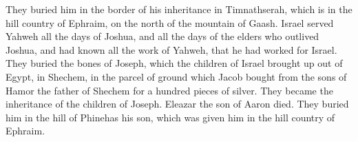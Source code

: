 {They buried him in the border of his inheritance in Timnathserah, which is in the hill country of Ephraim, on the north of the mountain of Gaash.
Israel served Yahweh all the days of Joshua, and all the days of the elders who outlived Joshua, and had known all the work of Yahweh, that he had worked for Israel.
They buried the bones of Joseph, which the children of Israel brought up out of Egypt, in Shechem, in the parcel of ground which Jacob bought from the sons of Hamor the father of Shechem for a hundred pieces of silver. They became the inheritance of the children of Joseph.
Eleazar the son of Aaron died. They buried him in the hill of Phinehas his son, which was given him in the hill country of Ephraim.
\par }